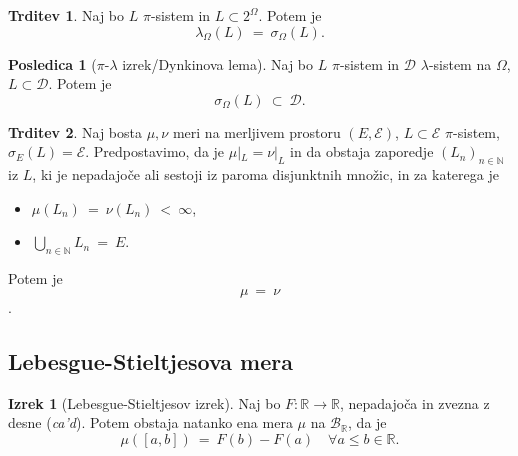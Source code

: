 \documentclass[11pt]{article}
\newcommand{\R}{\mathbb{R}}
\newcommand{\N}{\mathbb{N}}
\newcommand{\D}{\mathcal{D}}
\renewcommand{\L}{L}
\newcommand{\B}{\mathscr{B}}
\newcommand{\EE}{\mathcal{E}}
\newcommand{\1}{\mathbbm{1}}
\theoremstyle{definition}
\theoremstyle{definition}
\newtheorem{trditev}{Trditev}[section]
\theoremstyle{definition}
\newtheorem{izrek}{Izrek}[section]
\theoremstyle{definition}
\newtheorem*{posledica}{Posledica}
\begin{document}
\begin{trditev}

Naj bo $\L$ $\pi$-sistem in $\L \subset 2^\Omega$. Potem je
$$\lambda_\Omega(\L) ~=~ \sigma_\Omega(\L).$$

\end{trditev}
\vspace{0.5cm}

\begin{posledica}[$\pi$-$\lambda$ izrek/Dynkinova lema]

Naj bo $\L$ $\pi$-sistem in $\D$ $\lambda$-sistem na $\Omega$, $\L \subset \D$. Potem je
$$\sigma_\Omega(\L) ~\subset~ \D.$$

\end{posledica}
\vspace{0.5cm}

\begin{trditev}

Naj bosta $\mu, \nu$ meri na merljivem prostoru $(E,\EE)$, $\L \subset \EE$ $\pi$-sistem, $\sigma_E(\L) = \EE$. Predpostavimo, da je $\mu |_\L = \nu |_\L$ in da obstaja zaporedje $(L_n)_{n \in \N}$ iz $\L$, ki je nepadajoče ali sestoji iz paroma disjunktnih množic, in za katerega je
\begin{itemize}
	\item $\mu(L_n) ~=~ \nu(L_n) ~<~ \infty$,
	\item $\bigcup_{n \in \N} L_n ~=~ E$.
\end{itemize}
Potem je 
$$\mu ~=~ \nu$$.

\end{trditev}
\vspace{0.5cm}


\subsection{Lebesgue-Stieltjesova mera}
\vspace{0.5cm}

\begin{izrek}[Lebesgue-Stieltjesov izrek]

Naj bo $F: \R \rightarrow \R$, nepadajoča in zvezna z desne (\textit{ca'd}). Potem obstaja natanko ena mera $\mu$ na $\B_\R$, da je
$$\mu([a,b]) ~=~ F(b) - F(a) \quad \forall a\leq b \in \R.$$

\end{izrek}
\vspace{0.5cm}
\end{document}
